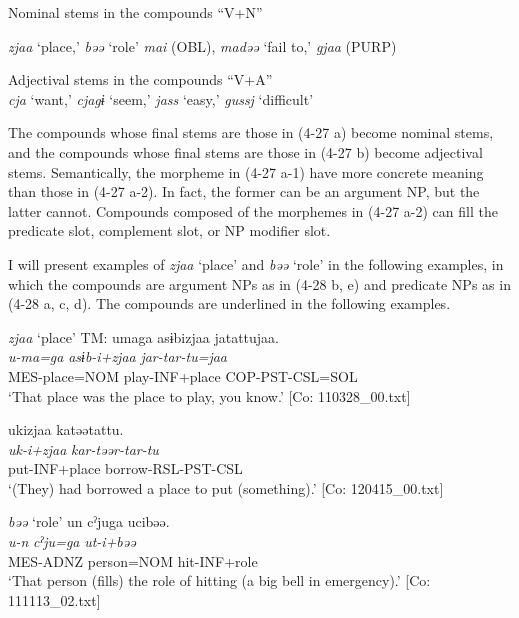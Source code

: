 \ea \label{ex:4.27}
\ea Nominal stems in the compounds “V+N” \label{ex:4.27a}
\begin{xlisti} \ex  \textit{zjaa} ‘place,’ \textit{bəə} ‘role’
\ex \textit{mai} (OBL), \textit{madəə} ‘fail to,’ \textit{gjaa} (PURP)
\end{xlisti}
\ex Adjectival stems in the compounds “V+A”\\\label{ex:4.27b}
    \textit{cja} ‘want,’ \textit{cjagɨ} ‘seem,’ \textit{jass} ‘easy,’ \textit{gussj} ‘difficult’
\z
\z  

The compounds whose final stems are those in (4-27 a) become nominal stems, and the compounds whose final stems are those in (4-27 b) become adjectival stems. Semantically, the morpheme in (4-27 a-1) have more concrete meaning than those in (4-27 a-2). In fact, the former can be an argument NP, but the latter cannot. Compounds composed of the morphemes in (4-27 a-2) can fill the predicate slot, complement slot, or NP modifier slot.

I will present examples of \textit{zjaa} ‘place’ and \textit{bəə} ‘role’ in the following examples, in which the compounds are argument NPs as in (4-28 b, e) and predicate NPs as in (4-28 a, c, d). The compounds are underlined in the following examples.

\ea  \textit{zjaa} ‘place’ \label{ex:4.28}
\ea\label{ex:4.28a}
\glll  TM:  umaga  asɨbizjaa  jatattujaa.\\
      \textit{u-ma=ga}  \textit{asɨb-i+zjaa}  \textit{jar-tar-tu=jaa}\\
      MES-place=NOM  play-INF+place  COP-PST-CSL=SOL\\
      \glt       ‘That place was the place to play, you know.’ [Co: 110328\_00.txt]

\ex\label{ex:4.28b}
  \glll  ukizjaa  katəətattu.\\
      \textit{uk-i+zjaa}  \textit{kar-təər-tar-tu}\\
      put-INF+place  borrow-RSL-PST-CSL\\
      \glt       ‘(They) had borrowed a place to put (something).’ [Co: 120415\_00.txt]

\exi{} \textit{bəə} ‘role’
\ex\label{ex:4.28c}
\glll  un  cˀjuga  ucibəə.\\
      \textit{u-n}  \textit{cˀju=ga}  \textit{ut-i+bəə}\\
      MES-ADNZ  person=NOM  hit-INF+role\\
      \glt       ‘That person (fills) the role of hitting (a big bell in emergency).’ [Co: 111113\_02.txt]

